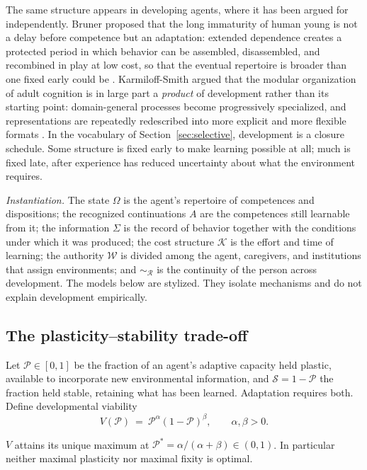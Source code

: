 The same structure appears in developing agents, where it has been argued for independently. Bruner proposed that the long immaturity of human young is not a delay before competence but an adaptation: extended dependence creates a protected period in which behavior can be assembled, disassembled, and recombined in play at low cost, so that the eventual repertoire is broader than one fixed early could be \cite{bruner1972}. Karmiloff-Smith argued that the modular organization of adult cognition is in large part a \emph{product} of development rather than its starting point: domain-general processes become progressively specialized, and representations are repeatedly redescribed into more explicit and more flexible formats \cite{karmiloffsmith1992}. In the vocabulary of Section~\ref{sec:selective}, development is a closure schedule. Some structure is fixed early to make learning possible at all; much is fixed late, after experience has reduced uncertainty about what the environment requires.

\emph{Instantiation.} The state $\Omega$ is the agent's repertoire of competences and dispositions; the recognized continuations $A$ are the competences still learnable from it; the information $\Sigma$ is the record of behavior together with the conditions under which it was produced; the cost structure $\mathcal{K}$ is the effort and time of learning; the authority $\mathcal{W}$ is divided among the agent, caregivers, and institutions that assign environments; and $\sim_{\mathcal{R}}$ is the continuity of the person across development. The models below are stylized. They isolate mechanisms and do not explain development empirically.

\subsection{The plasticity–stability trade-off}

Let $\mathcal{P}\in[0,1]$ be the fraction of an agent's adaptive capacity held plastic, available to incorporate new environmental information, and $\mathcal{S}=1-\mathcal{P}$ the fraction held stable, retaining what has been learned. Adaptation requires both. Define developmental viability
\begin{equation}\label{eq:devviability}
V(\mathcal{P})\ =\ \mathcal{P}^{\alpha}(1-\mathcal{P})^{\beta},\qquad\alpha,\beta>0.
\end{equation}

\begin{observation}\label{obs:devinterior}
$V$ attains its unique maximum at $\mathcal{P}^\ast=\alpha/(\alpha+\beta)\in(0,1)$. In particular neither maximal plasticity nor maximal fixity is optimal.
\end{observation}

